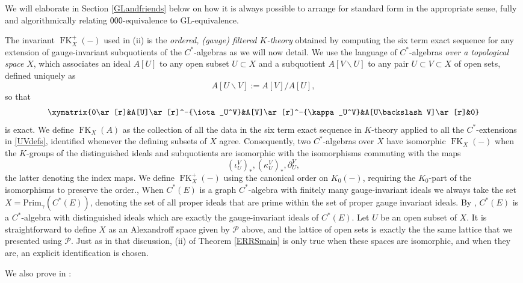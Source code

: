 \documentclass[12pt]{amsbook}%
\theoremstyle{defin}
\theoremstyle{remark}
\numberwithin{equation}{chapter}
\numberwithin{theor}{section}
\newcommand{\xyz}[1]{\mbox{$\mathsf{#1}$}}
\newcommand{\FKX}{\operatorname{FK}_X}
\newcommand{\FKXp}{\operatorname{FK}_X^+}
\newcommand{\GL}{{\sf GL}}
\begin{document}
We will elaborate in Section \ref{GLandfriends} below  on how it is always possible to arrange for standard form in the appropriate sense, fully and algorithmically relating  \xyz{000}-equivalence to \GL-equivalence.

The invariant $\FKXp(-)$ used in (ii) is the \emph{ordered, (gauge) filtered $K$-theory} obtained by computing the six term exact sequence for any extension of gauge-invariant subquotients of the $C^*$-algebras as we will now detail. We use the language of $C^*$-algebras \emph{over a topological space} $X$, which associates an ideal $A[U]$ to any open subset $U\subset X$ and a subquotient $A[V\backslash U]$ to any pair $U\subset V\subset X$ of open sets, defined uniquely as\index{FKx@$\FKX(-)$}\index{FKxp@$\FKXp(-)$}
\[
A[U\backslash V]:=A[V]/A[U],
\]
so that
\begin{equation}\label{UVdefs}
\xymatrix
{0\ar[r]&A[U]\ar[r]^-{\iota _U^V}&A[V]\ar[r]^-{\kappa_U^V}&A[U\backslash V]\ar[r]&0}
\end{equation}
is exact. We define $\FKX(A)$ as the collection of all the data in the six term exact sequence in $K$-theory applied to all the $C^*$-extensions in \eqref{UVdefs}, identified whenever the defining subsets of $X$ agree. Consequently, two $C^*$-algebras over $X$ have isomorphic $\FKX(-)$ when the $K$-groups of the distinguished ideals and subquotients are isomorphic with the isomorphisms commuting with the maps
\[
(\iota_U^V)_*,(\kappa_U^V)_*,\partial_U^V,
\]
the latter denoting the index maps. We define $\FKXp(-)$ using the canonical order on $K_0(-)$, requiring the $K_0$-part of the isomorphisms to preserve the order.,
When $C^*(E)$ is a graph $C^*$-algebra with finitely many gauge-invariant ideals we always take the set  $X = \mathrm{Prim}_\gamma (C^*(E))$, denoting the set of all proper ideals that are prime within the set of proper gauge invariant ideals.  By \cite[Lemma~3.7]{segrerapws:ics}, $C^*(E)$ is a $C^*$-algebra with distinguished ideals which are exactly the gauge-invariant ideals of $C^*(E)$.  Let $U$ be an open subset of $X$. 
It is straightforward to define $X$ as an Alexandroff space given by $\mathcal P$ above, and the lattice of open sets is exactly the the same lattice that we presented using $\mathcal P$.
Just as in that discussion, (ii) of Theorem \ref{ERRSmain} is only true when these spaces are isomorphic, and when they are, an explicit identification is chosen.

We also prove in \cite{segrerapws:ccuggs}:
\end{document}
